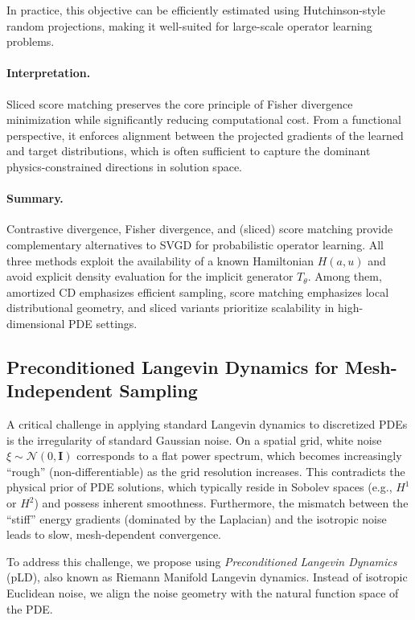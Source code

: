 \documentclass[11pt]{article}
\begin{document}
In practice, this objective can be efficiently estimated using Hutchinson-style random projections, making it well-suited for large-scale operator learning problems.

\paragraph{Interpretation.}
Sliced score matching preserves the core principle of Fisher divergence minimization while significantly reducing computational cost. From a functional perspective, it enforces alignment between the projected gradients of the learned and target distributions, which is often sufficient to capture the dominant physics-constrained directions in solution space.

\paragraph{Summary.}
Contrastive divergence, Fisher divergence, and (sliced) score matching provide complementary alternatives to SVGD for probabilistic operator learning. All three methods exploit the availability of a known Hamiltonian $H(a,u)$ and avoid explicit density evaluation for the implicit generator $T_\theta$. Among them, amortized CD emphasizes efficient sampling, score matching emphasizes local distributional geometry, and sliced variants prioritize scalability in high-dimensional PDE settings.

\subsection{Preconditioned Langevin Dynamics for Mesh-Independent Sampling}

A critical challenge in applying standard Langevin dynamics to discretized PDEs is the irregularity of standard Gaussian noise. On a spatial grid, white noise $\xi \sim \mathcal{N}(0, \mathbf{I})$ corresponds to a flat power spectrum, which becomes increasingly ``rough'' (non-differentiable) as the grid resolution increases. This contradicts the physical prior of PDE solutions, which typically reside in Sobolev spaces (e.g., $H^1$ or $H^2$) and possess inherent smoothness. Furthermore, the mismatch between the ``stiff'' energy gradients (dominated by the Laplacian) and the isotropic noise leads to slow, mesh-dependent convergence.

To address this challenge, we propose using \textit{Preconditioned Langevin Dynamics} (pLD), also known as Riemann Manifold Langevin dynamics. Instead of isotropic Euclidean noise, we align the noise geometry with the natural function space of the PDE.
\end{document}
